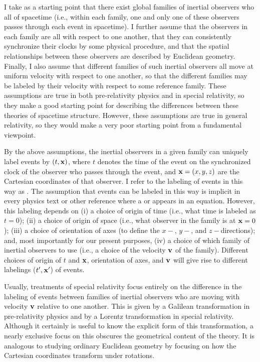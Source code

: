 I take as a starting point that there exist global families of inertial observers who  all of spacetime (i.e., within each family, one and only one of these observers passes through each event in spacetime). I further assume that the observers in each family are all  with respect to one another, that they can consistently synchronize their clocks by some physical procedure, and that the spatial relationships between these observers are described by Euclidean geometry. Finally, I also assume that different families of such inertial observers all move at uniform velocity with respect to one another, so that the different families may be labeled by their velocity with respect to some reference family. These assumptions are true in both pre-relativity physics and in special relativity, so they make a good starting point for describing the differences between these theories of spacetime structure. However, these assumptions are  true in general relativity, so they would make a very poor starting point from a fundamental viewpoint.

By the above assumptions, the inertial observers in a given family can uniquely label events by $(t, \vb{x})$, where $t$ denotes the time of the event on the synchronized clock of the observer who passes through the event, and $\vb{x} = (x, y, z)$ are the Cartesian coordinates of that observer. I refer to the labeling of events in this way as . The assumption that events can be labeled in this way is implicit in every physics text or other reference where a  or  appears in an equation. However,   this labeling depends on (i) a choice of origin of time (i.e., what time is labeled as $t=0$); (ii) a choice of origin of space (i.e., what observer in the family is at $\vb{x} = 0$); (iii) a choice of orientation of axes (to define the $x-$, $y-$,  and $z-$directions); and, most importantly for our present purposes, (iv) a choice of which family of inertial observers to use (i.e., a choice of the velocity $\vb{v}$ of the family). Different choices of origin of $t$ and $\vb{x}$, orientation of axes, and $\vb{v}$ will give rise to different labelings ($t', \vb{x}'$) of events. 

Usually, treatments of special relativity focus entirely on the difference in the labeling of events between families of inertial observers who are moving with velocity $\vb{v}$ relative to one another. This is given by a Galilean transformation in pre-relativity physics and by a Lorentz transformation in special relativity. Although it certainly is useful to know the explicit form of this transformation, a nearly exclusive focus on this obscures the geometrical content of the theory. It is analogous to studying ordinary Euclidean geometry by focusing on how the Cartesian coordinates transform under rotations. 

